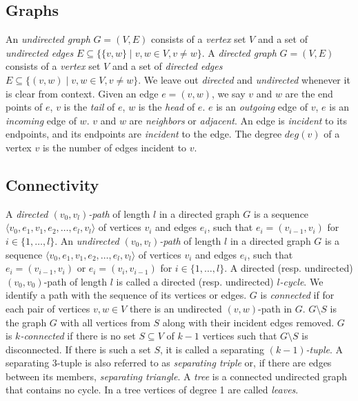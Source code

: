 \documentclass[a4paper]{article}
\begin{document}
\subsection{Graphs}
An \emph{undirected graph} $G = (V,E)$ consists of a \emph{vertex} set $V$ and
a set of \emph{undirected edges} $E \subseteq \{\{v,w\} \mid v,w \in V, v \not=
w\}$.
A \emph{directed graph} $G = (V,E)$ consists of a \emph{vertex} set $V$ and a
set of \emph{directed edges} $E \subseteq \{(v,w) \mid v,w \in V, v \not= w\}$.
We leave out \emph{directed} and \emph{undirected} whenever it is clear from
context.
Given an edge $e = (v,w)$, we say
$v$ and $w$ are the end points of $e$,
$v$ is the \emph{tail} of $e$,
$w$ is the \emph{head} of $e$.
$e$ is an \emph{outgoing} edge of $v$,
$e$ is an \emph{incoming} edge of $w$.
$v$ and $w$ are \emph{neighbors} or \emph{adjacent}.
An edge is \emph{incident} to its endpoints,
and its endpoints are \emph{incident} to the edge.
The degree $deg(v)$ of a vertex $v$ is the number of edges incident to $v$.

\subsection{Connectivity}
A \emph{directed $(v_0,v_l)$-path} of length $l$ in a directed graph $G$ is a
sequence $\langle v_0,e_1,v_1,e_2,\dots,e_l,v_l \rangle$ of vertices $v_i$ and
edges $e_i$, such that $e_i = (v_{i-1},v_i)$ for $i \in \{1,\dots,l\}$.
An \emph{undirected $(v_0,v_l)$-path} of length $l$ in a directed graph $G$ is
a sequence $\langle v_0,e_1,v_1,e_2,\dots,e_l,v_l \rangle$ of vertices $v_i$ and
edges $e_i$, such that $e_i = (v_{i-1},v_i)$ or $e_i = (v_i,v_{i-1})$ for $i \in
\{1,\dots,l\}$.
A directed (resp. undirected) $(v_0,v_0)$-path of length $l$ is called a
directed (resp. undirected) \emph{$l$-cycle}.
We identify a path with the sequence of its vertices or edges.
$G$ is \emph{connected} if for each pair of vertices $v,w \in V$ there is an
undirected $(v,w)$-path in $G$.
$G \setminus S$ is the graph $G$ with all vertices from $S$ along with their
incident edges removed.
$G$ is \emph{$k$-connected} if there is no set $S \subseteq V$ of $k-1$ vertices
such that $G \setminus S$ is disconnected.
If there is such a set $S$, it is called a separating \emph{$(k-1)$-tuple}.
A separating 3-tuple is also referred to as \emph{separating triple} or, if
there are edges between its members, \emph{separating triangle}.
A \emph{tree} is a connected undirected graph that contains no cycle.
In a tree vertices of degree 1 are called \emph{leaves}.
\end{document}
